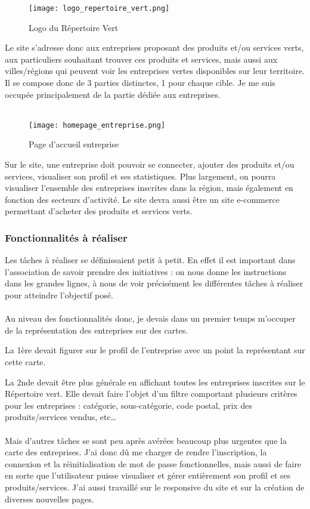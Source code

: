 \begin{figure}[H]
    \centering
    \texttt{[image: logo\_repertoire\_vert.png]}
    \caption{Logo du Répertoire Vert}
\end{figure}

Le site s'adresse donc aux entreprises proposant des produits et/ou services verts, aux particuliers souhaitant trouver ces produits et services, 
mais aussi aux villes/régions qui peuvent voir les entreprises vertes disponibles sur leur territoire. Il se compose donc de 3 parties distinctes, 1 pour chaque cible.
Je me suis occupée principalement de la partie dédiée aux entreprises.
\\\\
\begin{figure}[H]
    \centering
    \texttt{[image: homepage\_entreprise.png]}
    \caption{Page d'accueil entreprise}
\end{figure}


Sur le site, une entreprise doit pouvoir se connecter, ajouter des produits et/ou services, visualiser son profil et ses statistiques.
Plus largement, on pourra visualiser l'ensemble des entreprises inscrites dans la région, mais également en fonction des secteurs d'activité. Le site devra aussi être un site e-commerce permettant d'acheter des produits et services verts.

\subsubsection{Fonctionnalités à réaliser}

Les tâches à réaliser se définissaient petit à petit. En effet il est important dans l'association de savoir prendre des initiatives : 
on nous donne les instructions dans les grandes lignes, à nous de voir précisément les différentes tâches à réaliser pour atteindre l'objectif posé.
\\\\
Au niveau des fonctionnalités donc, je devais dans un premier temps m'occuper de la représentation des entreprises sur des cartes. 

La 1ère devait figurer sur le profil de l'entreprise avec un point la représentant sur cette carte.

La 2nde devait être plus générale en affichant toutes les entreprises inscrites sur le Répertoire vert. 
Elle devait faire l'objet d'un filtre comportant plusieurs critères pour les entreprises : catégorie, sous-catégorie, code postal, prix des produits/services vendus, etc\dots
\\\\
Mais d'autres tâches se sont peu après avérées beaucoup plus urgentes que la carte des entreprises. J'ai donc dû me charger de rendre l'inscription, la connexion et la réinitialisation de mot de passe fonctionnelles, 
mais aussi de faire en sorte que l'utilisateur puisse visualiser et gérer entièrement son profil et ses produits/services. J'ai aussi travaillé sur le responsive du site et sur la création de diverses nouvelles pages.

